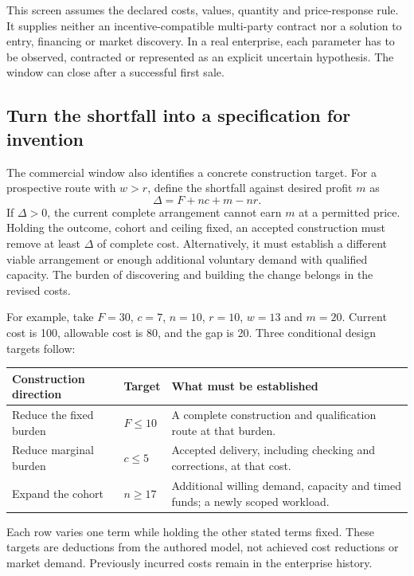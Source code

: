 \documentclass[11pt,letterpaper]{article}
\begin{document}
This screen assumes the declared costs, values, quantity and price-response rule. It supplies neither an incentive-compatible multi-party contract nor a solution to entry, financing or market discovery. In a real enterprise, each parameter has to be observed, contracted or represented as an explicit uncertain hypothesis. The window can close after a successful first sale.

\subsection{Turn the shortfall into a specification for invention}
The commercial window also identifies a concrete construction target. For a prospective route with $w>r$, define the shortfall against desired profit $m$ as
\begin{equation}
\Delta=F+nc+m-nr.
\label{eq:construction-gap}
\end{equation}
If $\Delta>0$, the current complete arrangement cannot earn $m$ at a permitted price. Holding the outcome, cohort and ceiling fixed, an accepted construction must remove at least $\Delta$ of complete cost. Alternatively, it must establish a different viable arrangement or enough additional voluntary demand with qualified capacity. The burden of discovering and building the change belongs in the revised costs.

For example, take $F=30$, $c=7$, $n=10$, $r=10$, $w=13$ and $m=20$. Current cost is 100, allowable cost is 80, and the gap is 20. Three conditional design targets follow:
\begin{center}\small
\begin{tabularx}{\linewidth}{@{}P{3.2cm}P{2.1cm}Y@{}}\toprule
Construction direction & Target & What must be established\\\midrule
Reduce the fixed burden & $F\le10$ & A complete construction and qualification route at that burden.\\
Reduce marginal burden & $c\le5$ & Accepted delivery, including checking and corrections, at that cost.\\
Expand the cohort & $n\ge17$ & Additional willing demand, capacity and timed funds; a newly scoped workload.\\\bottomrule
\end{tabularx}\end{center}
Each row varies one term while holding the other stated terms fixed. These targets are deductions from the authored model, not achieved cost reductions or market demand. Previously incurred costs remain in the enterprise history.
\end{document}
